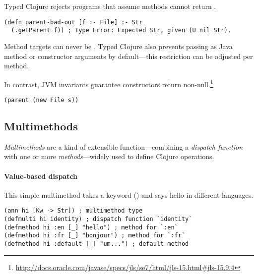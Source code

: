 Typed Clojure rejects programs that assume methods cannot return .
%
\begin{lstlisting}
(defn parent-bad-out [f :- File] :- Str
  (.getParent f)) ; Type Error: Expected Str, given (U nil Str).
\end{lstlisting}
Method targets can never be .
Typed Clojure also prevents passing  as Java method or
constructor arguments by default---this restriction can be
adjusted per method.

%
%
%
In contrast, JVM invariants guarantee constructors return non-null.\footnote{\url{http://docs.oracle.com/javase/specs/jls/se7/html/jls-15.html#jls-15.9.4}}
%
\begin{exmp}
\begin{lstlisting}
(parent (new File s))
\end{lstlisting}
\end{exmp}


\subsection{Multimethods}

\label{sec:multioverview}

\emph{Multimethods} are a kind of extensible function---combining a \emph{dispatch function} with 
one or more \emph{methods}---widely used to define Clojure operations.

\paragraph{Value-based dispatch}
This simple multimethod takes a keyword () and says hello in different languages.%

\begin{exmp}
\begin{lstlisting}
(ann hi [Kw -> Str]) ; multimethod type
(defmulti hi identity) ; dispatch function `identity`
(defmethod hi :en [_] "hello") ; method for `:en`
(defmethod hi :fr [_] "bonjour") ; method for `:fr`
(defmethod hi :default [_] "um...") ; default method
\end{lstlisting}
\label{example:hi-multimethod}
\end{exmp}

